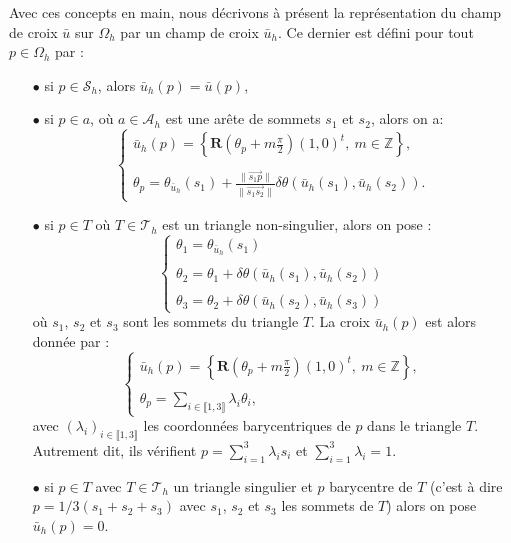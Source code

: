 Avec ces concepts en main, nous décrivons à présent la représentation du champ de croix $\bar{u}$ sur $\Omega_h$ par un champ de croix $\bar{u}_h$. Ce dernier est défini pour tout $p\in\Omega_h$ par :\\
\begin{itemize}
\item[$\bullet$] si $p\in\mathcal{S}_h$, alors $\bar{u}_h(p)=\bar{u}(p)$,\\[-0.2cm]
\item[$\bullet$] si $p\in a$, où $a\in\mathcal{A}_h$ est une arête de sommets $s_1$ et $s_2$, alors on a:
$$
\left\{
\begin{array}{l}
\bar{u}_h(p)=\displaystyle\left\{\mathbf{R}\left(\theta_p+m\frac{\pi}{2}\right)(1,0)^t,~m\in\mathbb{Z}\right\},\\\\
\theta_p=\theta_{\bar{u}_h}(s_1)+\displaystyle\frac{\|\overrightarrow{s_1p}\|}{\|\overrightarrow{s_1s_2}\|}\delta\theta(\bar{u}_h(s_1),\bar{u}_h(s_2)).
\end{array}
\right.
$$
\item[$\bullet$] si $p\in T$ où $T\in\mathcal{T}_h$ est un triangle non-singulier, alors on pose :%
$$
\left\{
\begin{array}{l}
\theta_1 = \theta_{\bar{u}_h}(s_1)\\\\
\theta_2 = \theta_1 + \delta\theta(\bar{u}_h(s_1),\bar{u}_h(s_2))\\\\
\theta_3 = \theta_2 + \delta\theta(\bar{u}_h(s_2),\bar{u}_h(s_3))
\end{array}
\right.
$$
où $s_1$, $s_2$ et $s_3$ sont les sommets du triangle $T$. La croix $\bar{u}_h(p)$ est alors donnée par :
$$
\left\{
\begin{array}{l}
\bar{u}_h(p)=\displaystyle\left\{\mathbf{R}\left(\theta_p+m\frac{\pi}{2}\right)(1,0)^t,~m\in\mathbb{Z}\right\},\\\\
\theta_p=\displaystyle\sum_{i\in\llbracket1, 3\rrbracket}\lambda_i\theta_i,
\end{array}
\right.
$$
avec $(\lambda_i)_{i\in\llbracket 1, 3\rrbracket}$ les coordonnées barycentriques de $p$ dans le triangle $T$. Autrement dit, ils vérifient $p=\sum_{i=1}^3\lambda_i s_i$ et $\sum_{i=1}^3\lambda_i=1$.
\\[-0.2cm]
\item[$\bullet$] si $p\in T$ avec $T\in\mathcal{T}_h$ un triangle singulier  et $p$ barycentre de $T$ (c'est à dire $p=1/3(s_1+s_2+s_3)$ avec $s_1$, $s_2$ et $s_3$ les sommets de $T$) alors on pose $\bar{u}_h(p)=0$.\\[-0.2cm]

\end{itemize}
